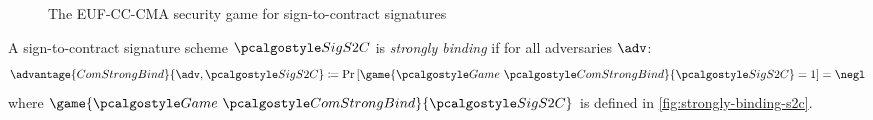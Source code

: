 \begin{figure}[tbh]
  \begin{tcolorbox}
    \begin{pchstack}[center]
      \pchspace
    \end{pchstack}
  \end{tcolorbox}
  \caption{The EUF-CC-CMA security game for sign-to-contract signatures}
  \label{fig:euf-cma-s2c}
\end{figure}

\begin{definition}\label{def:euf-cma-s2c}
	A sign-to-contract signature scheme $\algo{SigS2C}$ is \emph{strongly binding} if for all \ppt adversaries $\adv$:
	\[
	  \advantage{ComStrongBind}{\adv, \algo{SigS2C}} \defeq \pr{\game{\Game~\algo{ComStrongBind }}{\algo{SigS2C}} = 1} = \negl
	\]
	where $\game{\Game~\algo{ComStrongBind}}{\algo{SigS2C}}$ is defined in \autoref{fig:strongly-binding-s2c}.
\end{definition}

